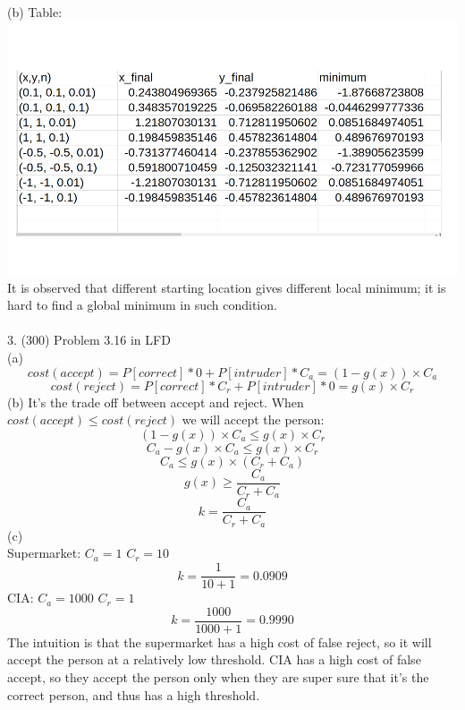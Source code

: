 \documentclass[12pt]{article}
\begin{document}
(b) Table:\\ %
\includegraphics[scale=0.6]{image/table}\\
It is observed that different starting location gives different local minimum; it is hard to find a global minimum in such condition.\\\\
3. (300) Problem 3.16 in LFD\\
(a)%
$$cost(accept) = P[correct]*0 + P[intruder]*C_a = (1-g(x))\times C_a$$
$$cost(reject) = P[correct]*C_r + P[intruder]*0 = g(x)\times C_r$$
(b) It's the trade off between accept and reject. When $cost(accept)\leq cost(reject)$ we will accept the person: %
$$(1-g(x))\times C_a \leq g(x)\times  C_r $$
$$C_a-g(x)\times C_a \leq g(x)\times  C_r $$
$$C_a \leq g(x)\times  (C_r+C_a) $$
$$g(x) \geq \frac{C_a}{C_r+C_a} $$
$$k = \frac{C_a}{C_r+C_a} $$
(c)\\%
Supermarket: $C_a=1$ $C_r=10$
$$k = \frac{1}{10+1} = 0.0909$$
CIA: $C_a=1000$ $C_r=1$
$$k = \frac{1000}{1000+1} = 0.9990$$
The intuition is that the supermarket has a high cost of false reject, so it will accept the person at a relatively low threshold. CIA has a high cost of false accept, so they accept the person only when they are super sure that it's the correct person, and thus has a high threshold.
\end{document}
